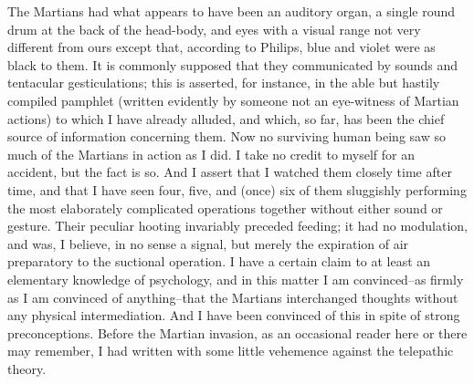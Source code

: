 The Martians had what appears to have been an auditory organ, a
single round drum at the back of the head-body, and eyes with a
visual range not very different from ours except that, according to
Philips, blue and violet were as black to them. It is commonly
supposed that they communicated by sounds and tentacular
gesticulations; this is asserted, for instance, in the able but
hastily compiled pamphlet (written evidently by someone not an
eye-witness of Martian actions) to which I have already alluded,
and which, so far, has been the chief source of information
concerning them. Now no surviving human being saw so much of the
Martians in action as I did. I take no credit to myself for an
accident, but the fact is so. And I assert that I watched them
closely time after time, and that I have seen four, five, and
(once) six of them sluggishly performing the most elaborately
complicated operations together without either sound or gesture.
Their peculiar hooting invariably preceded feeding; it had no
modulation, and was, I believe, in no sense a signal, but merely
the expiration of air preparatory to the suctional operation. I
have a certain claim to at least an elementary knowledge of
psychology, and in this matter I am convinced--as firmly as I am
convinced of anything--that the Martians interchanged thoughts
without any physical intermediation. And I have been convinced of
this in spite of strong preconceptions. Before the Martian
invasion, as an occasional reader here or there may remember, I had
written with some little vehemence against the telepathic theory.


